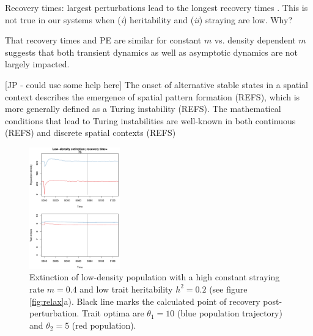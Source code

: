 \documentclass[twocolumn,preprintnumbers,amsmath,amssymb,superscriptaddress]{revtex4}
\newcommand{\beginsupplement}{%
        \clearpage
        \setcounter{table}{0}
        \renewcommand{\thetable}{S\arabic{table}}%
        \setcounter{figure}{0}
        \renewcommand{\thefigure}{S\arabic{figure}}%
     }
\begin{document}
Recovery times: largest perturbations lead to the longest recovery times \cite{Ovaskainen:2002il}.
This is not true in our systems when (\emph{i}) heritability and (\emph{ii}) straying are low. Why?

That recovery times and PE are similar for constant $m$ vs. density dependent $m$ suggests that both transient dynamics as well as asymptotic dynamics are not largely impacted.

[JP - could use some help here]
The onset of alternative stable states in a spatial context describes the emergence of spatial pattern formation (REFS), which is more generally defined as a Turing instability (REFS).
The mathematical conditions that lead to Turing instabilities are well-known in both continuous (REFS) and discrete spatial contexts (REFS)







\beginsupplement


\begin{figure}
  \captionsetup{justification=raggedright,
singlelinecheck=false
}
\centering
\includegraphics[width=0.35\textwidth]{figs2/fig_relax_small.pdf}
\caption{
Extinction of low-density population with a high constant straying rate $m=0.4$ and low trait heritability $h^2=0.2$ (see figure \ref{fig:relax}a).
Black line marks the calculated point of recovery post-perturbation.
Trait optima are $\theta_1 = 10$ (blue population trajectory) and $\theta_2 = 5$ (red population).
} \label{fig:relaxtraj_ldlh}
\end{figure}
\end{document}
